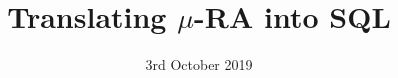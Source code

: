 \documentclass[16pt, aspectratio=1610]{beamer}
\newcommand{\mus}{{$\mu$-RA}}
\newcommand{\fixpt}[2][X]{\mu {\left(#1=#2\right)}}
\newcommand*\blue[1]{{\color{blue}#1}}
\newcommand*\dblue[1]{{\color{darkblue}#1}}
\newcommand*\green[1]{{\color{darkgreen}#1}}
\begin{document}
\title{Translating \mus{} into SQL}
\date{3rd October 2019}













\end{document}

